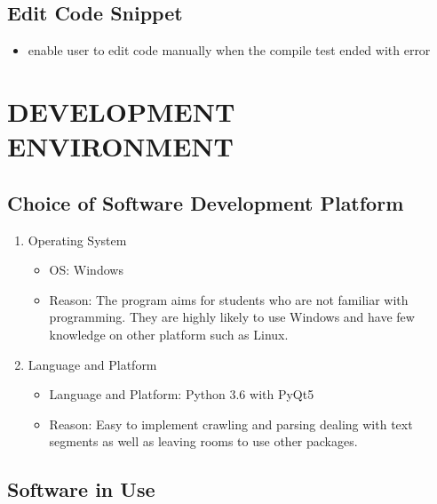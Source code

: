 \documentclass[conference]{IEEEtran}
\begin{document}
\subsection{Edit Code Snippet}
  \begin{itemize}
    \item enable user to edit code manually when the compile test ended with error
  \end{itemize}
\textit{ }


\section{DEVELOPMENT ENVIRONMENT} %
\label{sec:development_environment}
\subsection{Choice of Software Development Platform} %
\label{sub:choice_of_software_development_platform}

\begin{enumerate}
  \item Operating System
  \begin{itemize}
    \item OS: Windows
    \item Reason: The program aims for students who are not familiar with programming. They are highly likely to use Windows and have few knowledge on other platform such as Linux.
  \end{itemize}
  \item Language and Platform
  \begin{itemize}
    \item Language and Platform: Python 3.6 with PyQt5
    \item Reason: Easy to implement crawling and parsing dealing with text segments as well as leaving rooms to use other packages.
  \end{itemize}
\end{enumerate}
\textit{}


\subsection{Software in Use} %
\label{sub:software_in_use}
\end{document}
